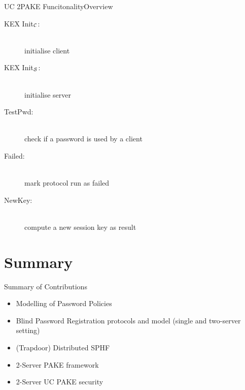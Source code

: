 \documentclass[notes,xcolor=dvipsnames]{beamer}
\begin{document}
\begin{frame}{UC 2PAKE Funcitonality}{Overview}
  \begin{description}

    \item[KEX Init$_\mathcal{C}$:] \hfill\\ initialise client
    \item[KEX Init$_\mathcal{S}$:] \hfill\\ initialise server
    \item[TestPwd:] \hfill\\ check if a password is used by a client
    \item[Failed:] \hfill\\ mark protocol run as failed
	  \item[NewKey:] \hfill\\ compute a new session key as result
	
  \end{description}
\end{frame}

\section{Summary}



\begin{frame}{Summary of Contributions}

\begin{itemize}\itemsep1em
	\item Modelling of Password Policies
	\item Blind Password Registration protocols and model (single and two-server setting)
	\item (Trapdoor) Distributed SPHF
	\item 2-Server PAKE framework
	\item 2-Server UC PAKE security
\end{itemize}

\end{frame}
\end{document}
